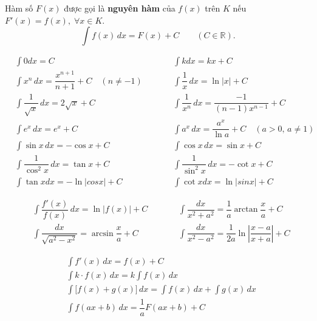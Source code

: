 \documentclass[12pt,a4paper]{article}
\begin{document}
\begin{dinhnghia}
  Hàm số $F(x)$ được gọi là \textbf{nguyên hàm} của $f(x)$ trên $K$ nếu $F'(x) = f(x),\;\forall x \in K$.
  \[
    \int f(x)\,dx = F(x) + C \qquad (C \in \mathbb{R}).
  \]
\end{dinhnghia}

\begin{congthuc}[title={Bảng nguyên hàm cơ bản}]
  \begin{align*}
    &\int 0 dx = C
    &\qquad&
    \int k dx = kx + C \\[6pt]
    &\int x^n\,dx = \dfrac{x^{n+1}}{n+1} + C \quad (n \ne -1)
    &\qquad&
    \int \dfrac{1}{x}\,dx = \ln|x| + C \\[6pt]
    &\int \dfrac{1}{\sqrt{x}}\,dx = 2\sqrt{x} + C
    &\qquad&
    \int \dfrac{1}{x^n}\,dx = \dfrac{-1}{(n - 1)x^{n - 1}} + C \\[6pt]
    &\int e^x\,dx = e^x + C
    &&
    \int a^x\,dx = \dfrac{a^x}{\ln a} + C \quad (a > 0,\, a \ne 1) \\[6pt]
    &\int \sin x\,dx = -\cos x + C
    &&
    \int \cos x\,dx = \sin x + C \\[6pt]
    &\int \dfrac{1}{\cos^2 x}\,dx = \tan x + C
    &&
    \int \dfrac{1}{\sin^2 x}\,dx = -\cot x + C \\[6pt]
    &\int \tan x dx = -\ln{|cos x|} + C
    &&
    \int \cot x dx = \ln{|sin x|} + C
  \end{align*}
\end{congthuc}

\begin{congthuc}[title={Một số nguyên hàm bổ sung}]
  \begin{align*}
    &\int \dfrac{f'(x)}{f(x)}\,dx = \ln\bigl|f(x)\bigr| + C
    &\qquad&
    \int \dfrac{dx}{x^2 + a^2} = \dfrac{1}{a}\arctan\dfrac{x}{a} + C \\[6pt]
    &\int \dfrac{dx}{\sqrt{a^2 - x^2}} = \arcsin\dfrac{x}{a} + C
    &&
    \int \dfrac{dx}{x^2 - a^2} = \dfrac{1}{2a}\ln\left|\dfrac{x - a}{x + a}\right| + C
  \end{align*}
\end{congthuc}

\begin{tinhchat}
  \begin{align*}
    &\int f'(x)\,dx = f(x) + C \\[4pt]
    &\int k \cdot f(x)\,dx = k \int f(x)\,dx \\[4pt]
    &\int \bigl[f(x) + g(x)\bigr]\,dx = \int f(x)\,dx + \int g(x)\,dx \\[4pt]
    &\int f(ax + b)\,dx = \dfrac{1}{a} F(ax + b) + C
  \end{align*}
\end{tinhchat}
\end{document}
